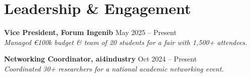 \documentclass[10pt, letterpaper]{article}
\newcommand{\entry}[4]{
  \noindent \textbf{#1} \hfill #2 \\
  \textit{#3} \hfill \textit{#4} \par 
}
\begin{document}
\section{Leadership \& Engagement}

\entry{Vice President, Forum Ingenib}{May 2025 -- Present}{Managed €100k budget \& team of 20 students for a fair with 1,500+ attendees.}{}

\vspace{2pt}

\entry{Networking Coordinator, ai4industry}{Oct 2024 -- Present}{Coordinated 30+ researchers for a national academic networking event.}{}
\end{document}
